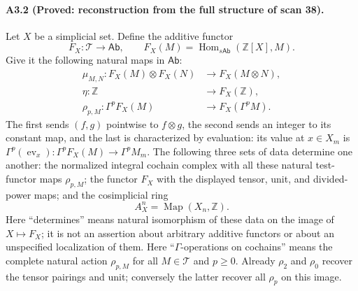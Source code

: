 \paragraph{A3.2 (Proved: reconstruction from the full structure of scan 38).}
\label{A3.2}
Let $X$ be a simplicial set. Define the additive functor
\[
 F_X:\mathcal T\longrightarrow\mathsf{Ab},\qquad
 F_X(M)=\operatorname{Hom}_{s\mathsf{Ab}}(\mathbb Z[X],M).
\]
Give it the following natural maps in $\mathsf{Ab}$:
\begin{align*}
 \mu_{M,N}:F_X(M)\otimes F_X(N)&\longrightarrow F_X(M\otimes N),\\
 \eta:\mathbb Z&\longrightarrow F_X(\mathbb Z),\\
 \rho_{p,M}:\Gamma^pF_X(M)&\longrightarrow F_X(\Gamma^pM).
\end{align*}
The first sends $(f,g)$ pointwise to $f\otimes g$, the second sends
an integer to its constant map, and the last is characterized by
evaluation: its value at $x\in X_m$ is
$\Gamma^p(\operatorname{ev}_x):\Gamma^pF_X(M)\to\Gamma^pM_m$.
The following three sets of data determine one another:
the normalized integral cochain complex with all these natural
test-functor maps $\rho_{p,M}$; the functor $F_X$ with the displayed
tensor, unit, and divided-power maps; and the cosimplicial ring
\[
 A_X^n=\operatorname{Map}(X_n,\mathbb Z).
\]
Here ``determines'' means natural isomorphism of these data on the image
of $X\mapsto F_X$; it is not an assertion about arbitrary additive
functors or about an unspecified localization of them. Here
``$\Gamma$-operations on cochains'' means the complete natural action
$\rho_{p,M}$ for all $M\in\mathcal T$ and $p\geq0$.
Already $\rho_2$ and $\rho_0$ recover the tensor pairings and unit;
conversely the latter recover all $\rho_p$ on this image.

